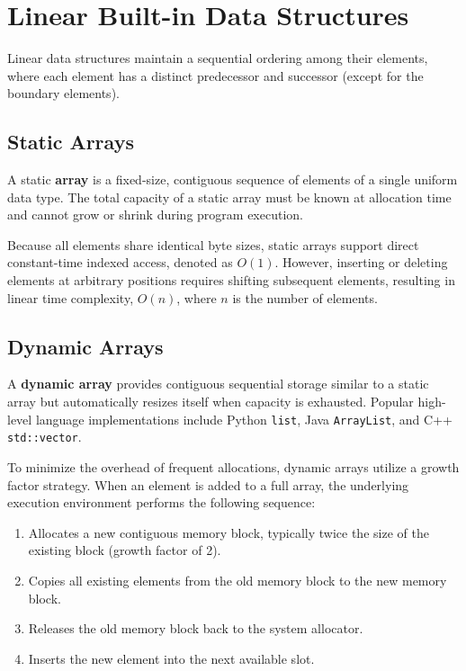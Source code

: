 \documentclass[12pt]{report}
\begin{document}
\section{Linear Built-in Data Structures}

Linear data structures maintain a sequential ordering among their elements, where each element has a distinct predecessor and successor (except for the boundary elements).

\subsection{Static Arrays}

A static \textbf{array} is a fixed-size, contiguous sequence of elements of a single uniform data type. The total capacity of a static array must be known at allocation time and cannot grow or shrink during program execution.

Because all elements share identical byte sizes, static arrays support direct constant-time indexed access, denoted as $O(1)$. However, inserting or deleting elements at arbitrary positions requires shifting subsequent elements, resulting in linear time complexity, $O(n)$, where $n$ is the number of elements.

\subsection{Dynamic Arrays}

A \textbf{dynamic array} provides contiguous sequential storage similar to a static array but automatically resizes itself when capacity is exhausted. Popular high-level language implementations include Python \texttt{list}, Java \texttt{ArrayList}, and C++ \texttt{std::vector}.

To minimize the overhead of frequent allocations, dynamic arrays utilize a growth factor strategy. When an element is added to a full array, the underlying execution environment performs the following sequence:
\begin{enumerate}
    \item Allocates a new contiguous memory block, typically twice the size of the existing block (growth factor of 2).
    \item Copies all existing elements from the old memory block to the new memory block.
    \item Releases the old memory block back to the system allocator.
    \item Inserts the new element into the next available slot.
\end{enumerate}
\end{document}
